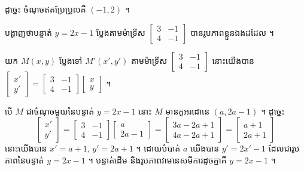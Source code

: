 ដូច្នេះ ចំណុចឥតប្រែប្រួលគឺ $(-1, 2)$ ។

\begin{example}[លំហាត់គំរូ ២]
បង្ហាញថាបន្ទាត់ $y = 2x - 1$ ប្លែងតាមម៉ាទ្រីស $\begin{bmatrix} 3 & -1\\ 4 & -1 \end{bmatrix}$ បានរូបភាពខ្លួនឯងដដែល ។
\end{example}
\ans
យក $M(x, y)$ ប្លែងទៅ $M'(x', y')$ តាមម៉ាទ្រីស $\begin{bmatrix} 3 & -1\\ 4 & -1 \end{bmatrix}$ នោះយើងបាន $\begin{bmatrix} x'\\ y' \end{bmatrix} = \begin{bmatrix} 3 & -1\\ 4 & -1 \end{bmatrix}\begin{bmatrix} x\\ y \end{bmatrix}$ ។

បើ $M$ ជាចំណុចមួយនៃបន្ទាត់ $y = 2x - 1$ នោះ $M$ មានកូអរដោនេ $(a, 2a - 1)$ ។ ដូច្នេះ
\[ \begin{bmatrix} x'\\ y' \end{bmatrix} = \begin{bmatrix} 3 & -1\\ 4 & -1 \end{bmatrix}\begin{bmatrix} a\\ 2a - 1 \end{bmatrix} = \begin{bmatrix} 3a - 2a + 1\\ 4a - 2a + 1 \end{bmatrix} = \begin{bmatrix} a + 1\\ 2a + 1 \end{bmatrix} \]
នោះយើងបាន $x' = a + 1$, $y' = 2a + 1$ ។ ដោយបំបាត់ $a$ យើងបាន $y' = 2x' - 1$ ដែលជារូបភាពនៃបន្ទាត់ $y = 2x - 1$ ។ បន្ទាត់ដើម និងរូបភាពវាមានសមីការដូចគ្នាគឺ $y = 2x - 1$ ។


